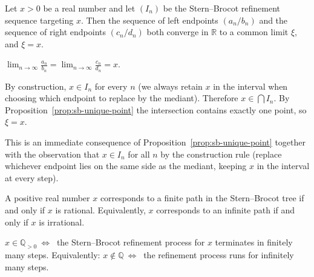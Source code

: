 
\begin{corollary}
\label{cor:sb-path-limit}
Let $x > 0$ be a real number and let $(I_n)$ be the Stern--Brocot
refinement sequence targeting $x$.  Then the sequence of left endpoints
$(a_n/b_n)$ and the sequence of right endpoints $(c_n/d_n)$ both
converge in $\mathbb{R}$ to a common limit $\xi$, and $\xi = x$.
\end{corollary}

\begin{remark}
$\displaystyle\lim_{n \to \infty} \frac{a_n}{b_n}
 = \lim_{n \to \infty} \frac{c_n}{d_n} = x$.
\end{remark}

\begin{remark}[Why $\xi = x$]
By construction, $x \in I_n$ for every $n$ (we always retain $x$ in the
interval when choosing which endpoint to replace by the mediant).
Therefore $x \in \bigcap I_n$. By Proposition~\ref{prop:sb-unique-point}
the intersection contains exactly one point, so $\xi = x$.
\end{remark}

\begin{remark}
This is an immediate consequence of Proposition~\ref{prop:sb-unique-point}
together with the observation that $x \in I_n$ for all $n$ by the
construction rule (replace whichever endpoint lies on the same side as
the mediant, keeping $x$ in the interval at every step).
\end{remark}


\begin{corollary}
\label{cor:sb-limit-irrational}
A positive real number $x$ corresponds to a finite path in the
Stern--Brocot tree if and only if $x$ is rational.  Equivalently,
$x$ corresponds to an infinite path if and only if $x$ is irrational.
\end{corollary}

\begin{remark}
$x \in \mathbb{Q}_{>0}\ \Longleftrightarrow\ $ the Stern--Brocot refinement
process for $x$ terminates in finitely many steps.
Equivalently:
$x \notin \mathbb{Q}\ \Longleftrightarrow\ $ the refinement process
runs for infinitely many steps.
\end{remark}

